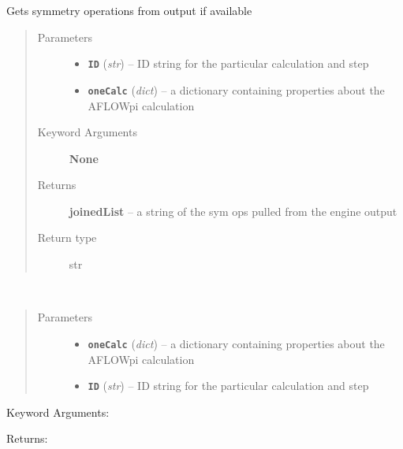 \documentclass[letterpaper,10pt,english]{sphinxmanual}
\begin{document}
\begin{fulllineitems}
\label{retr:retr.__getSymList}
Gets symmetry operations from output if available
\begin{quote}\begin{description}
\item[{Parameters}] \leavevmode\begin{itemize}
\item {} 
\textbf{\texttt{ID}} (\emph{str}) -- ID string for the particular calculation and step

\item {} 
\textbf{\texttt{oneCalc}} (\emph{dict}) -- a dictionary containing properties about the AFLOWpi calculation

\end{itemize}

\item[{Keyword Arguments}] \leavevmode
\textbf{None}

\item[{Returns}] \leavevmode
\textbf{joinedList} --
a string of the sym ops pulled from the engine output

\item[{Return type}] \leavevmode
str

\end{description}\end{quote}

\end{fulllineitems}


\begin{fulllineitems}
\label{retr:retr.__getSymmInput}~\begin{quote}\begin{description}
\item[{Parameters}] \leavevmode\begin{itemize}
\item {} 
\textbf{\texttt{oneCalc}} (\emph{dict}) -- a dictionary containing properties about the AFLOWpi calculation

\item {} 
\textbf{\texttt{ID}} (\emph{str}) -- ID string for the particular calculation and step

\end{itemize}

\end{description}\end{quote}

Keyword Arguments:

Returns:

\end{fulllineitems}
\end{document}
